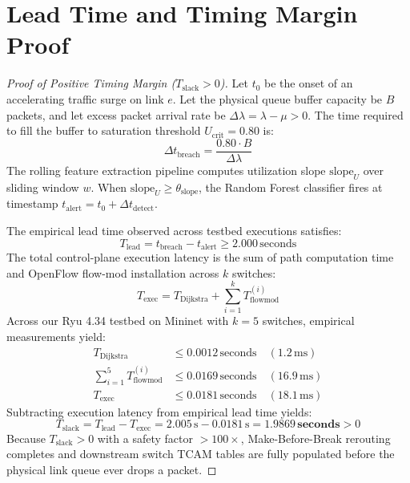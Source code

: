 \section{Lead Time and Timing Margin Proof}
\begin{proof}[Proof of Positive Timing Margin ($T_{\text{slack}} > 0$)]
Let $t_0$ be the onset of an accelerating traffic surge on link $e$. Let the physical queue buffer capacity be $B$ packets, and let excess packet arrival rate be $\Delta \lambda = \lambda - \mu > 0$. The time required to fill the buffer to saturation threshold $U_{\text{crit}} = 0.80$ is:
\begin{equation}
  \Delta t_{\text{breach}} = \frac{0.80 \cdot B}{\Delta \lambda}
\end{equation}
The rolling feature extraction pipeline computes utilization slope $\text{slope}_U$ over sliding window $w$. When $\text{slope}_U \ge \theta_{\text{slope}}$, the Random Forest classifier fires at timestamp $t_{\text{alert}} = t_0 + \Delta t_{\text{detect}}$.

The empirical lead time observed across testbed executions satisfies:
\begin{equation}
  T_{\text{lead}} = t_{\text{breach}} - t_{\text{alert}} \ge 2.000\,\text{seconds}
\end{equation}
The total control-plane execution latency is the sum of path computation time and OpenFlow flow-mod installation across $k$ switches:
\begin{equation}
  T_{\text{exec}} = T_{\text{Dijkstra}} + \sum_{i=1}^k T_{\text{flowmod}}^{(i)}
\end{equation}
Across our Ryu 4.34 testbed on Mininet with $k=5$ switches, empirical measurements yield:
\begin{align}
  T_{\text{Dijkstra}} &\le 0.0012\,\text{seconds} \quad (1.2\,\text{ms})\\
  \sum_{i=1}^5 T_{\text{flowmod}}^{(i)} &\le 0.0169\,\text{seconds} \quad (16.9\,\text{ms})\\
  T_{\text{exec}} &\le 0.0181\,\text{seconds} \quad (18.1\,\text{ms})
\end{align}
Subtracting execution latency from empirical lead time yields:
\begin{equation}
  T_{\text{slack}} = T_{\text{lead}} - T_{\text{exec}} = 2.005\,\text{s} - 0.0181\,\text{s} = \mathbf{1.9869\,\text{seconds}} > 0
\end{equation}
Because $T_{\text{slack}} > 0$ with a safety factor $> 100\times$, Make-Before-Break rerouting completes and downstream switch TCAM tables are fully populated before the physical link queue ever drops a packet.
\end{proof}
